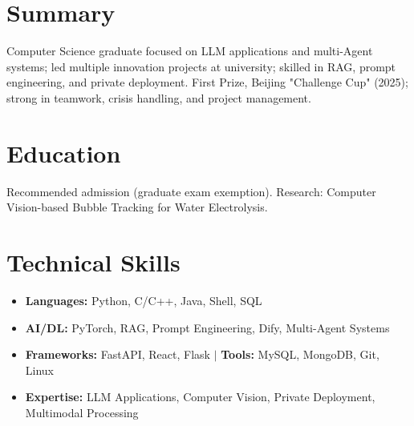 \documentclass[10pt]{resume}
\begin{document}


\section{Summary}
Computer Science graduate focused on LLM applications and multi-Agent systems; led multiple innovation projects at university; skilled in RAG, prompt engineering, and private deployment. First Prize, Beijing "Challenge Cup" (2025); strong in teamwork, crisis handling, and project management.


\section{Education}

Recommended admission (graduate exam exemption). Research: Computer Vision-based Bubble Tracking for Water Electrolysis.

\section{Technical Skills}
\begin{itemize}[parsep=0.1ex, leftmargin=1.2pc]
  \item \textbf{Languages:} Python, C/C++, Java, Shell, SQL
  \item \textbf{AI/DL:} PyTorch, RAG, Prompt Engineering, Dify, Multi-Agent Systems
  \item \textbf{Frameworks:} FastAPI, React, Flask $|$ \textbf{Tools:} MySQL, MongoDB, Git, Linux
  \item \textbf{Expertise:} LLM Applications, Computer Vision, Private Deployment, Multimodal Processing
\end{itemize}
\end{document}
